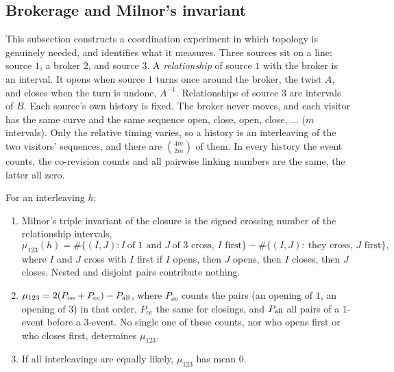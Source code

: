 \documentclass[11pt]{article}
\theoremstyle{definition}\newtheorem{definition}[theorem]{Definition}\newtheorem{remark}[theorem]{Remark}\newtheorem{example}[theorem]{Example}\newtheorem{problem}[theorem]{Open problem}\crefname{problem}{Problem}{Problems}
\begin{document}
\subsection{Brokerage and Milnor's invariant}\label{sec:brokerage}
This subsection constructs a coordination experiment in which topology is genuinely needed, and identifies what it measures. Three sources sit on a line: source $1$, a broker $2$, and source $3$. A \emph{relationship} of source $1$ with the broker is an interval. It opens when source $1$ turns once around the broker, the twist $A$, and closes when the turn is undone, $A^{-1}$. Relationships of source $3$ are intervals of $B$. Each source's own history is fixed. The broker never moves, and each visitor has the same curve and the same sequence open, close, open, close, $\dots$ ($m$ intervals). Only the relative timing varies, so a history is an interleaving of the two visitors' sequences, and there are $\binom{4m}{2m}$ of them. In every history the event counts, the co-revision counts and all pairwise linking numbers are the same, the latter all zero.

\begin{proposition}[brokerage]\label{prop:brokerage}
For an interleaving $h$:
\begin{enumerate}
\item[(i)] Milnor's triple invariant of the closure is the signed crossing number of the relationship intervals,
\[
\mu_{123}(h)=\#\{(I,J): I\ \text{of $1$ and } J\ \text{of $3$ cross, $I$ first}\}-\#\{(I,J):\ \text{they cross, $J$ first}\},
\]
where $I$ and $J$ cross with $I$ first if $I$ opens, then $J$ opens, then $I$ closes, then $J$ closes. Nested and disjoint pairs contribute nothing.
\item[(ii)] $\mu_{123}=2(P_{oo}+P_{cc})-P_{\rm all}$, where $P_{oo}$ counts the pairs (an opening of $1$, an opening of $3$) in that order, $P_{cc}$ the same for closings, and $P_{\rm all}$ all pairs of a $1$-event before a $3$-event. No single one of these counts, nor who opens first or who closes first, determines $\mu_{123}$.
\item[(iii)] If all interleavings are equally likely, $\mu_{123}$ has mean $0$.
\end{enumerate}
\end{proposition}
\end{document}

